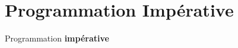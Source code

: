 \section{Programmation Impérative}

\begingroup
{}
\begin{frame}
    \begin{center}
        \vspace{1cm}
        {\Large\color{background} Programmation \textbf{impérative}}
    \end{center}
\end{frame}
\endgroup

